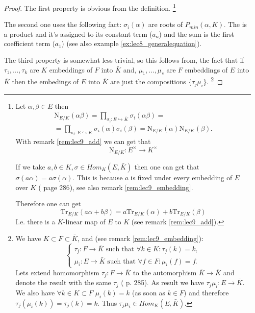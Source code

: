 \begin{property}
  \begin{proof}
    The first property is obvious from the definition.
    \footnote{
      Let $\alpha, \beta \in E$ then
      \begin{eqnarray}
        \mathrm{N}_{E/K}\left(\alpha \beta\right) =
          \prod_{\sigma_i: E \hookrightarrow \bar{K}}
          \sigma_i\left(\alpha \beta\right) =
          \nonumber \\
          =
          \prod_{\sigma_i: E \hookrightarrow \bar{K}}
          \sigma_i\left(\alpha\right)
          \sigma_i\left(\beta\right) 
          =
          \mathrm{N}_{E/K}\left(\alpha\right)
          \mathrm{N}_{E/K}\left(\beta\right).
        \nonumber
      \end{eqnarray}
      With remark \ref{rem:lec9_add} we can get that
      \[
      \mathrm{N}_{E/K}: E^\times \to K^\times
      \]

      If we take $a,b \in K, \sigma \in Hom_K\left(E, \bar{K}\right)$
      then one can get that
      $\sigma\left(a \alpha\right) = a
      \sigma\left(\alpha\right)$. This is because $a$ is fixed under
      every embedding of $E$ over $K$ (\cite{bib:lang} page 286), see
      also remark \ref{rem:lec9_embedding}.
      
      Therefore one can get
      \[
      \mathrm{Tr}_{E/K}\left(a \alpha + b \beta\right)=
      a \mathrm{Tr}_{E/K}\left(\alpha\right) +
      b \mathrm{Tr}_{E/K}\left(\beta\right)
      \]
      I.e. there is a $K$-linear map of $E$ to $K$
      (see remark \ref{rem:lec9_add}).
    }

    The second one uses the following fact:
    $\sigma_i\left(\alpha\right)$ are roots of $P_{min}\left(\alpha,
    K\right)$. The  is a product and it's assigned
    to its constant term ($a_n$) and the sum is the first coefficient 
    term ($a_1$) (see also example \ref{ex:lec8_generalequation}).

    The third property is somewhat less trivial, so this follows from,
    the fact that if $\tau_1, \dots, \tau_k$ are $K$ embeddings of $F$
    into $\bar{K}$ and, $\mu_1, \dots, \mu_s$ are $F$ embeddings of
    $E$ into $\bar{K}$ then the embedings of $E$ into $\bar{K}$ are
    just the compositions $\{\tau_j \mu_i\}$.
    \footnote{
      We have $K \subset F \subset \bar{K}$, and (see remark
      \ref{rem:lec9_embedding}):
      \[
      \begin{cases}
        \tau_j: F \to \bar{K} \text{ such that }
        \forall k \in K: \tau_j(k) = k, \\
        \mu_i: E \to \bar{K}  \text{ such that }
        \forall f \in F: \mu_i(f) = f.
      \end{cases}
      \]
      Lets extend homomorphism $\tau_j: F
      \to \bar{K}$ to the automorphism
      $\bar{K} \to \bar{K}$ and denote the result with the same
      $\tau_j$ (\cite{bib:lang} p. 285). 
      As result we have $\tau_j \mu_i: E \to \bar{K}$. We also have
      $\forall k \in K \subset F$
      \(
      \mu_i(k) = k
      \) (as soon as $k \in F$) and therefore
      $\tau_j(\mu_i(k)) = \tau_j(k) = k$. Thus
      $\tau_j \mu_i \in Hom_K\left(E, \bar{K}\right)$.
    }


\end{proof}
\end{property}
